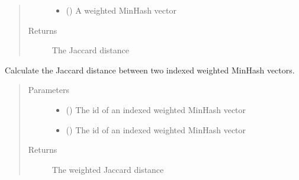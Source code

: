 \documentclass[letterpaper,10pt,english]{sphinxmanual}
\begin{document}
\begin{fulllineitems}
\begin{fulllineitems}
\begin{quote}
\begin{description}
\begin{itemize}
\item {} 
 () \textendash{} A weighted MinHash vector

\end{itemize}

\item[{Returns}] \leavevmode
{} The Jaccard distance

\end{description}\end{quote}

\end{fulllineitems}


\begin{fulllineitems}
\label{\detokenize{documentation:tmap.LSHForest.get_weighted_distance_by_id}}
Calculate the Jaccard distance between two indexed weighted MinHash vectors.
\begin{quote}\begin{description}
\item[{Parameters}] \leavevmode\begin{itemize}
\item {} 
 () \textendash{} The id of an indexed weighted MinHash vector

\item {} 
 () \textendash{} The id of an indexed weighted MinHash vector

\end{itemize}

\item[{Returns}] \leavevmode
{} The weighted Jaccard distance

\end{description}\end{quote}

\end{fulllineitems}



\end{fulllineitems}
\end{document}
